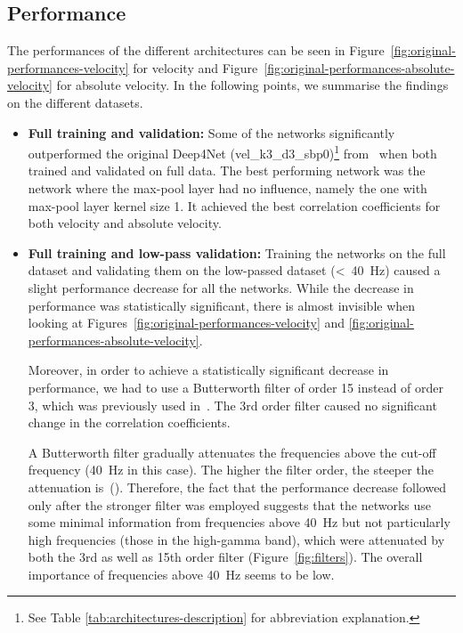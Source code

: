 \subsection{Performance}\label{subsec:performance}
The performances of the different architectures can be seen in Figure~\ref{fig:original-performances-velocity} for velocity and Figure~\ref{fig:original-performances-absolute-velocity} for absolute velocity.
In the following points, we summarise the findings on the different datasets.

\begin{itemize}
    \item \textbf{Full training and validation:} Some of the networks significantly outperformed the original Deep4Net (vel\_k3\_d3\_sbp0)\footnote{See Table \ref{tab:architectures-description} for abbreviation explanation.} from~\cite{Hammer-2021} when both trained and validated on full data.
    The best performing network was the network where the max-pool layer had no influence, namely the one with max-pool layer kernel size 1. It achieved the best correlation coefficients for both velocity and absolute velocity.
    
    \item \textbf{Full training and low-pass validation:} Training the networks on the full dataset and validating them on the low-passed dataset (<~40~Hz) caused a slight performance decrease for all the networks. While the decrease in performance was statistically significant, there is almost invisible when looking at Figures~\ref{fig:original-performances-velocity} and \ref{fig:original-performances-absolute-velocity}.
    
    Moreover, in order to achieve a statistically significant decrease in performance, we had to use a Butterworth filter of order 15 instead of order 3, which was previously used in~\cite{Hammer-2021}. The 3rd order filter caused no significant change in the correlation coefficients. 
    
    A Butterworth filter gradually attenuates the frequencies above the cut-off frequency (40~Hz in this case).
    The higher the filter order, the steeper the attenuation is~(\cite{butterworth1930theory}).
    Therefore, the fact that the performance decrease followed only after the stronger filter was employed suggests that the networks use some minimal information from frequencies above 40~Hz but not particularly high frequencies (those in the high-gamma band), which were attenuated by both the 3rd as well as 15th order filter (Figure~\ref{fig:filters}).
    The overall importance of frequencies above 40~Hz seems to be low. 
    

\end{itemize}
